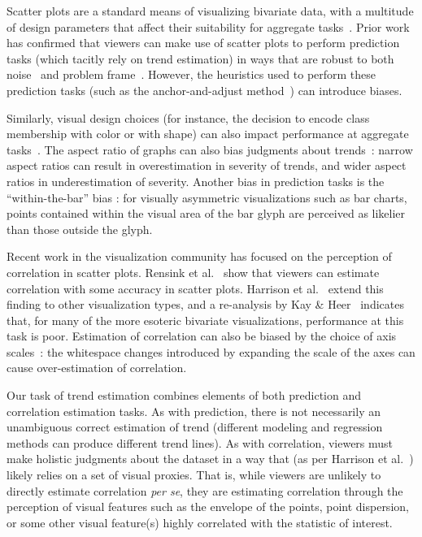 \documentclass{sigchi}
\begin{document}
Scatter plots are a standard means of visualizing bivariate data, with a multitude of design parameters that affect their suitability for aggregate tasks~\cite{cleveland1984many}. Prior work has confirmed that viewers can make use of scatter plots to perform prediction tasks (which tacitly rely on trend estimation) in ways that are robust to both noise~\cite{harvey1997effects} and problem frame~\cite{lewandowsky2011popular}. However, the heuristics used to perform these prediction tasks (such as the anchor-and-adjust method~\cite{bolger1993context}) can introduce biases.

Similarly, visual design choices (for instance, the decision to encode class membership with color or with shape) can also impact performance at aggregate tasks~\cite{gleicher2013perception,lewandowsky1989discriminating}. The aspect ratio of graphs can also bias judgments about trends~\cite{beattie2002impact}: narrow aspect ratios can result in overestimation in severity of trends, and wider aspect ratios in underestimation of severity. Another bias in prediction tasks is the ``within-the-bar'' bias \cite{newman2012bar}: for visually asymmetric visualizations such as bar charts, points contained within the visual area of the bar glyph are perceived as likelier than those outside the glyph.

Recent work in the visualization community has focused on the perception of correlation in scatter plots. Rensink et al.~\cite{rensink2010perception} show that viewers can estimate correlation with some accuracy in scatter plots. Harrison et al.~\cite{harrison2014ranking} extend this finding to other visualization types, and a re-analysis by Kay \& Heer~\cite{kay2016beyond} indicates that, for many of the more esoteric bivariate visualizations, performance at this task is poor. Estimation of correlation can also be biased by the choice of axis scales~\cite{cleveland1982variables}: the whitespace changes introduced by expanding the scale of the axes can cause over-estimation of correlation.

Our task of trend estimation combines elements of both prediction and correlation estimation tasks. As with prediction, there is not necessarily an unambiguous correct estimation of trend (different modeling and regression methods can produce different trend lines). As with correlation, viewers must make holistic judgments about the dataset in a way that (as per Harrison et al.~\cite{harrison2014ranking}) likely relies on a set of visual proxies. That is, while viewers are unlikely to directly estimate correlation \emph{per se}, they are estimating correlation through the perception of visual features such as the envelope of the points, point dispersion, or some other visual feature(s) highly correlated with the statistic of interest.
\end{document}
